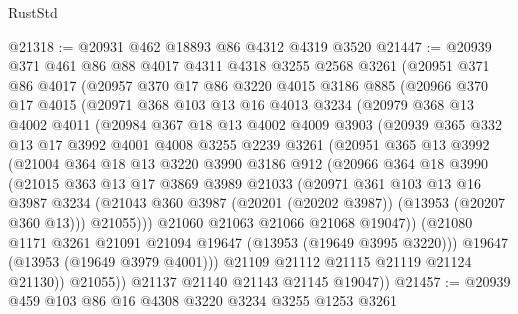 \begin{lexlean}{RustStd}
\begin{coremodule}
@21318 := @20931 @462 @18893 @86 @4312 @4319 @3520
@21447 := @20939
    @371
    @461
    @86
    @88
    @4017
    @4311
    @4318
    @3255
    @2568
    @3261
    (@20951
      @371
      @86
      @4017
      (@20957
        @370
        @17
        @86
        @3220
        @4015
        @3186
        @885
        (@20966
          @370
          @17
          @4015
          (@20971
            @368
            @103
            @13
            @16
            @4013
            @3234
            (@20979
              @368
              @13
              @4002
              @4011
              (@20984
                @367
                @18
                @13
                @4002
                @4009
                @3903
                (@20939
                  @365
                  @332
                  @13
                  @17
                  @3992
                  @4001
                  @4008
                  @3255
                  @2239
                  @3261
                  (@20951
                    @365
                    @13
                    @3992
                    (@21004
                      @364
                      @18
                      @13
                      @3220
                      @3990
                      @3186
                      @912
                      (@20966
                        @364
                        @18
                        @3990
                        (@21015
                          @363
                          @13
                          @17
                          @3869
                          @3989
                          @21033
                          (@20971
                            @361
                            @103
                            @13
                            @16
                            @3987
                            @3234
                            (@21043 @360 @3987 (@20201 (@20202 @3987)) (@13953 (@20207 @360 @13)))
                            @21055)))
                      @21060
                      @21063
                      @21066
                      @21068
                      @19047))
                  (@21080 @1171 @3261 @21091 @21094 @19647 (@13953 (@19649 @3995 @3220)))
                  @19647
                  (@13953 (@19649 @3979 @4001)))
                @21109
                @21112
                @21115
                @21119
                @21124
                @21130))
            @21055))
        @21137
        @21140
        @21143
        @21145
        @19047))
@21457 := @20939 @459 @103 @86 @16 @4308 @3220 @3234 @3255 @1253 @3261

\end{coremodule}
\end{lexlean}
